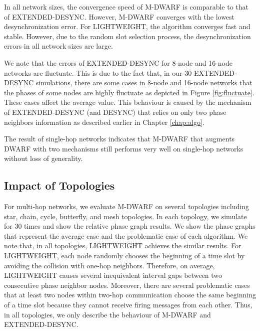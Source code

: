 In all network sizes, the convergence speed of M-DWARF is comparable to that of EXTENDED-DESYNC. However, M-DWARF converges with the lowest desynchronization error. For LIGHTWEIGHT, the algorithm converges fast and stable. However, due to the random slot selection process, the desynchronization errors in all network sizes are large.

We note that the errors of EXTENDED-DESYNC for 8-node and 16-node networks are fluctuate. This is due to the fact that, in our 30 EXTENDED-DESYNC simulations, there are some cases in 8-node and 16-node networks that the phases of some nodes are highly fluctuate as depicted in Figure \ref{fig:fluctuate}. These cases affect the average value. This behaviour is caused by the mechanism of EXTENDED-DESYNC (and DESYNC) that relies on only two phase neighbors information as described earlier in Chapter \ref{chap:algo}.

The result of single-hop networks indicates that M-DWARF that augments DWARF with two mechanisms still performs very well on single-hop networks without loss of generality. 


\subsection{Impact of Topologies}
For multi-hop networks, we evaluate M-DWARF on several topologies including star, chain, cycle, butterfly, and mesh topologies. In each topology, we simulate for 30 times and show the relative phase graph results. We show the phase graphs that represent the average case and the problematic case of each algorithm. We note that, in all topologies, LIGHTWEIGHT achieves the similar results. For LIGHTWEIGHT, each node randomly chooses the beginning of a time slot by avoiding the collision with one-hop neighbors. Therefore, on average, LIGHTWEIGHT causes several inequivalent interval gaps between two consecutive phase neighbor nodes. Moreover, there are several problematic cases that at least two nodes within two-hop communication choose the same beginning of a time slot because they cannot receive firing messages from each other. Thus, in all topologies, we only describe the behaviour of M-DWARF and EXTENDED-DESYNC.

